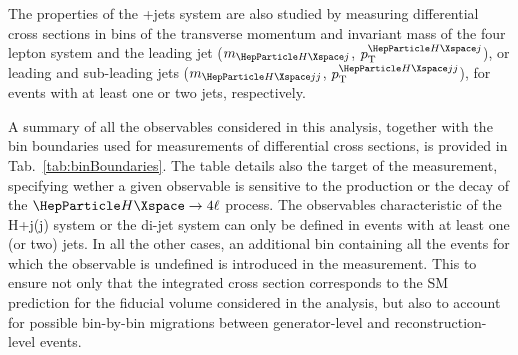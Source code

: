 The properties of the \PH+jets system are also studied by measuring differential cross sections in bins of the transverse momentum and invariant mass of the four lepton system and the leading jet ($m_{\PH j}$, $\pt^{\PH j}$), or leading and sub-leading jets ($m_{\PH jj}$, $\pt^{\PH jj}$), for events with at least one or two jets, respectively.


A summary of all the observables considered in this analysis, together with the bin boundaries used for measurements of differential cross sections, is provided in Tab.~\ref{tab:binBoundaries}. The table details also the target of the measurement, specifying wether a given observable is sensitive to the production or the decay of the $\PH\rightarrow 4\ell$ process.
The observables characteristic of the H+j(j) system or the di-jet system can only be defined in events with at least one (or two) jets. In all the other cases, an additional bin containing all the events for which the observable is undefined is introduced in the measurement. This to ensure not only that the integrated cross section corresponds to the SM prediction for the fiducial volume considered in the analysis, but also to account for possible bin-by-bin migrations between generator-level and reconstruction-level events.

